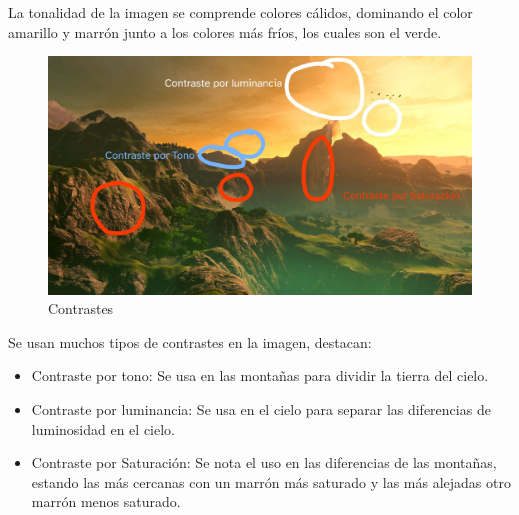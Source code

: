 \documentclass[12pt]{article}
\begin{document}
          La tonalidad de la imagen se comprende colores cálidos, dominando el color amarillo y marrón junto a los colores más fríos, los cuales son el verde.

          \begin{figure}[H]
            \centering
            \includegraphics[scale = 0.2]{Jesus/Seccion16/Contrastes.jpg}
            \caption{Contrastes}
          \end{figure} 

          Se usan muchos tipos de contrastes en la imagen, destacan: 
          \begin{itemize}
            \item Contraste por tono: Se usa en las montañas para dividir la tierra del cielo.
            \item Contraste por luminancia: Se usa en el cielo para separar las diferencias de luminosidad en el cielo. 
            \item Contraste por Saturación: Se nota el uso en las diferencias de las montañas, estando las más cercanas con un marrón más saturado y las más alejadas otro marrón menos saturado.
          \end{itemize}
          
        \newpage

\end{document}

